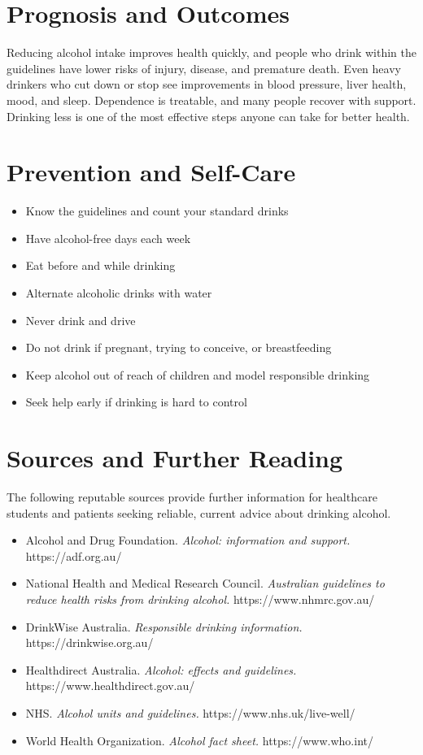 \section*{Prognosis and Outcomes}
Reducing alcohol intake improves health quickly, and people who drink within the guidelines have lower risks of injury, disease, and premature death. Even heavy drinkers who cut down or stop see improvements in blood pressure, liver health, mood, and sleep. Dependence is treatable, and many people recover with support. Drinking less is one of the most effective steps anyone can take for better health.

\section*{Prevention and Self-Care}
\begin{itemize}
    \item Know the guidelines and count your standard drinks
    \item Have alcohol-free days each week
    \item Eat before and while drinking
    \item Alternate alcoholic drinks with water
    \item Never drink and drive
    \item Do not drink if pregnant, trying to conceive, or breastfeeding
    \item Keep alcohol out of reach of children and model responsible drinking
    \item Seek help early if drinking is hard to control
\end{itemize}

\section*{Sources and Further Reading}
The following reputable sources provide further information for healthcare students and patients seeking reliable, current advice about drinking alcohol.

\begin{itemize}
    \item Alcohol and Drug Foundation. \textit{Alcohol: information and support.} https://adf.org.au/
    \item National Health and Medical Research Council. \textit{Australian guidelines to reduce health risks from drinking alcohol.} https://www.nhmrc.gov.au/
    \item DrinkWise Australia. \textit{Responsible drinking information.} https://drinkwise.org.au/
    \item Healthdirect Australia. \textit{Alcohol: effects and guidelines.} https://www.healthdirect.gov.au/
    \item NHS. \textit{Alcohol units and guidelines.} https://www.nhs.uk/live-well/
    \item World Health Organization. \textit{Alcohol fact sheet.} https://www.who.int/
\end{itemize}
